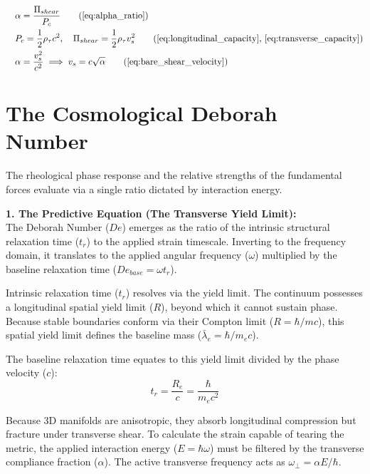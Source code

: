 \begin{tcolorbox}[recallbox, title={\ref{box:fine_structure}. The Fine-Structure Constant \& Shear Velocity}]
\begin{align}
    &\quad \alpha = \frac{\Pi_{shear}}{P_{c}} \tag{\ref{eq:alpha_ratio}} \\
    &\quad P_{c} = \frac{1}{2} \rho_\tau c^2, \quad \Pi_{shear} = \frac{1}{2} \rho_\tau v_s^2 \tag{\ref{eq:longitudinal_capacity}, \ref{eq:transverse_capacity}} \\
    &\quad \alpha = \frac{v_s^2}{c^2} \implies v_s = c \sqrt{\alpha} \tag{\ref{eq:bare_shear_velocity}}
\end{align}
\end{tcolorbox}









\section{The Cosmological Deborah Number}
\label{sec:deriv_unified_deborah}

The rheological phase response and the relative strengths of the fundamental forces evaluate via a single ratio dictated by interaction energy. 

\textbf{1. The Predictive Equation (The Transverse Yield Limit):} \\
The Deborah Number ($De$) emerges as the ratio of the intrinsic structural relaxation time ($t_r$) to the applied strain timescale. Inverting to the frequency domain, it translates to the applied angular frequency ($\omega$) multiplied by the baseline relaxation time ($De_{base} = \omega t_r$). 

Intrinsic relaxation time ($t_r$) resolves via the yield limit. The continuum possesses a longitudinal spatial yield limit ($R$), beyond which it cannot sustain phase. Because stable boundaries conform via their Compton limit ($R = \hbar/mc$), this spatial yield limit defines the baseline mass ($\bar{\lambda}_e = \hbar/m_e c$). 

The baseline relaxation time equates to this yield limit divided by the phase velocity ($c$): 
\begin{equation}
    t_r = \frac{R_e}{c} = \frac{\hbar}{m_e c^2} 
\end{equation}

Because 3D manifolds are anisotropic, they absorb longitudinal compression but fracture under transverse shear. To calculate the strain capable of tearing the metric, the applied interaction energy ($E = \hbar\omega$) must be filtered by the transverse compliance fraction ($\alpha$). The active transverse frequency acts as $\omega_{\perp} = \alpha E / \hbar$. 

